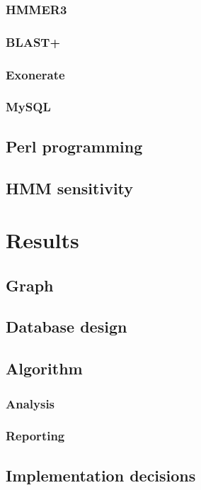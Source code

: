 \documentclass[a4paper,12pt]{scrreprt}
\begin{document}
		\subsection{HMMER3}
			
		\subsection{BLAST+}
			
		\subsection{Exonerate}
			
		\subsection{MySQL}
			
	\section{Perl programming}
		
	\section{HMM sensitivity}
		

\chapter{Results}
	
	\section{Graph}
		
	\section{Database design}
		
	\section{Algorithm}
		\subsection{Analysis}
			
		\subsection{Reporting}
			
	\section{Implementation decisions}
\end{document}
